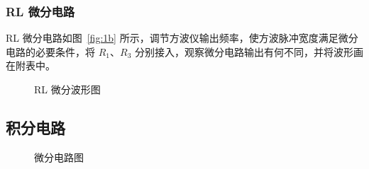 \documentclass[a4paper,utf8]{article}
\begin{document}
    \subsubsection{RL 微分电路}
        RL 微分电路如图~\ref{fig:1b} 所示，调节方波仪输出频率，使方波脉冲宽度满足微分电路的必要条件，将 $R_1$、$R_3$ 分别接入，观察微分电路输出有何不同，并将波形画在附表中。
        \begin{figure}[!ht]
            \hspace{6mm}
            \caption{RL 微分波形图}
        \end{figure}
\subsection{积分电路}
    \begin{figure}[!ht]
        \hspace{6mm}
        \caption{微分电路图}
    \end{figure}
\end{document}
